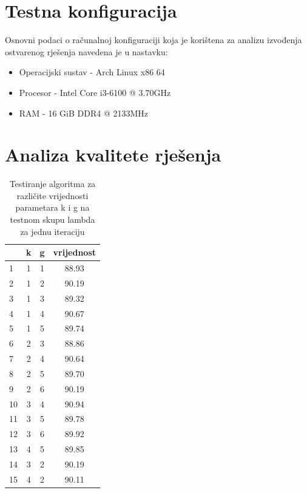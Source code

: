 \documentclass[times, utf8, seminar, numeric]{fer}
\begin{document}
\section{Testna konfiguracija}
Osnovni podaci o računalnoj konfiguraciji koja je korištena za analizu izvođenja ostvarenog rješenja navedena je u nastavku:
\renewcommand{\labelitemi}{$\bullet$}
\begin{itemize}
	\item Operacijski sustav - Arch Linux x86 64
	\item Procesor - Intel Core i3-6100 @ 3.70GHz
	\item RAM - 16 GiB DDR4 @ 2133MHz
\end{itemize}

\section{Analiza kvalitete rješenja}
\begin{table}[htb]
	\centering
	\begin{tabular}{l|ccc}
		& \multicolumn{1}{l}{k} &g 		&vrijednost\\ 	\hline
		 	1			&1	 	&1 		& 88.93 \\ 		\hline
		 	2			&1	 	&2		& 90.19 \\ 		\hline
		 	3			&1	 	&3 		& 89.32 \\ 		\hline
		 	4			&1	 	&4 		& 90.67 \\ 		\hline
		 	5			&1	 	&5 		& 89.74 \\ 		\hline
		 	6			&2	 	&3 		& 88.86 \\ 		\hline
		 	7			&2	 	&4		& 90.64 \\ 		\hline
		 	8			&2	 	&5		& 89.70 \\ 		\hline
		 	9			&2	 	&6 		& 90.19 \\ 		\hline
		 	10			&3	 	&4 		& 90.94 \\ 		\hline
		 	11			&3	 	&5 		& 89.78 \\ 		\hline
		 	12			&3	 	&6 		& 89.92 \\ 		\hline
		 	13			&4	 	&5 		& 89.85 \\ 		\hline
		 	14			&3		&2		& 90.19 \\		\hline
		 	15			&4		&2		& 90.11	\\		\hline
	\end{tabular}
	\caption{Testiranje algoritma za različite vrijednosti parametara k i g na testnom skupu lambda za jednu iteraciju}
	\label{table:lambda_test}
\end{table}
\end{document}
